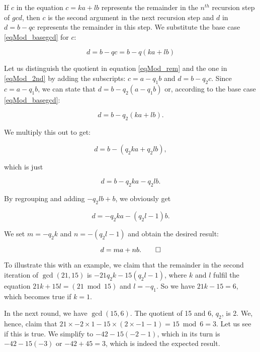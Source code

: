 \documentclass{scrreprt}
\begin{document}
If $c$ in the equation $c = ka + lb$
represents the remainder in the $n^{th}$ 
recursion step of $gcd$, then $c$
is the second argument in the next 
recursion step and $d$ in $d = b - qc$
represents the remainder in this step.
We substitute the base case 
\ref{eqMod_basegcd} for $c$:

\begin{equation}\label{eqMod_2nd}
d = b - qc = b - q(ka + lb)
\end{equation} 

Let us distinguish the quotient in equation \ref{eqMod_rem}
and the one in \ref{eqMod_2nd} by adding the subscripts:
$c = a - q_1b$ and $d = b - q_2c$.
Since $c = a - q_1b$, we can state that $d = b - q_2(a - q_1b)$
or, according to the base case \ref{eqMod_basegcd}: 

\begin{equation}
d = b - q_2(ka + lb).
\end{equation}

We multiply this out to get:

\begin{equation}
d = b - (q_2ka + q_2lb),
\end{equation}

which is just

\begin{equation}
d = b - q_2ka - q_2lb.
\end{equation}

By regrouping and adding $-q_2lb + b$, we obviously get

\begin{equation}\label{eqMod_mandn}
d = -q_2ka - (q_2l-1)b.
\end{equation}

We set $m = -q_2k$ and $n = -(q_2l-1)$
and obtain the desired result:

\begin{equation}
d = ma + nb.\qed
\end{equation}

To illustrate this with an example,
we claim that the remainder in the second 
iteration of $\gcd(21,15)$ is
$-21q_2k - 15(q_2l - 1)$,
where $k$ and $l$ fulfil the equation
$21k + 15l = (21 \bmod 15)$ and $l = -q_1$.
So we have
$21k - 15 = 6$, which becomes true if $k=1$.

In the next round, we have $\gcd(15,6)$.
The quotient of 15 and 6, $q_2$, is 2.
We, hence, claim that
$21 \times -2 \times 1 - 15 \times (2 \times -1  - 1) = 15 \bmod 6 = 3$. 
Let us see if this is true. We simplify to
$-42 - 15(-2 - 1)$, which in its turn is
$-42 - 15(-3)$ or $-42 + 45 = 3$,
which is indeed the expected result.
\end{document}
